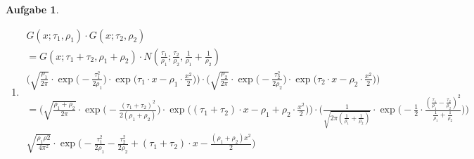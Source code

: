 \documentclass[12pt]{scrartcl}
\theoremstyle{definition}
\theoremstyle{exercise}
\newtheorem*{exercise*}{Aufgabe}
\begin{document}
\begin{exercise*}
\begin{enumerate}
			\item \scriptsize
				\begin{align*}
					G(x; \tau_{1}, \rho_{1}) \cdot G(x; \tau_{2}, \rho_{2})                                                                                                                                                                                                                                                                                                                                                                                                            &  \\
					= G(x; \tau_{1} + \tau_{2}, \rho_{1} + \rho_{2}) \cdot N(\frac{\tau_{1}}{\rho_{1}}; \frac{\tau_{2}}{\rho_{2}}, \frac{1}{\rho_{1}}+ \frac{1}{\rho_{2}})                                                                                                                                                                                                                                                                                                             &  \\
					\bigg(\sqrt{\frac{\rho_{1}}{2 \pi}}\cdot \exp\big(-\frac{\tau_{1}^{2}}{2\rho_{1}}\big) \cdot \exp\big(\tau_{1} \cdot x - \rho_{1} \cdot \frac{x^{2}}{2}\big)\bigg) \cdot \bigg(\sqrt{\frac{\rho_{2}}{2 \pi}}\cdot \exp\big(-\frac{\tau_{2}^{2}}{2\rho_{2}}\big) \cdot \exp\big(\tau_{2} \cdot x - \rho_{2} \cdot \frac{x^{2}}{2}\big)\bigg)                                                                                                                        &  \\
					= \bigg( \sqrt{\frac{\rho_{1} + \rho_{2}}{2 \pi}}\cdot \exp\big(-\frac{(\tau_{1} + \tau_{2})^{2}}{2(\rho_{1} + \rho_{2})}\big) \cdot \exp\big((\tau_{1} + \tau_{2}) \cdot x - \rho_{1} + \rho_{2} \cdot \frac{x^{2}}{2}\big) \bigg) \cdot \bigg( \frac{1}{\sqrt{2 \pi (\frac{1}{\rho_{1}} + \frac{1}{\rho_{2}})}}\cdot \exp\big(- \frac{1}{2} \cdot \frac{(\frac{\tau_1}{\rho_1}- \frac{\tau_2}{\rho_2})^{2}}{\frac{1}{\rho_{1}} + \frac{1}{\rho_{2}}}\big) \bigg) &  \\
					\sqrt{\frac{\rho_{1} \rho2}{4 \pi^{2}}}\cdot \exp\bigg(-\frac{\tau_{1}^{2}}{2\rho_{1}}-\frac{\tau_{2}^{2}}{2\rho_{2}}+ (\tau_{1} + \tau_{2}) \cdot x - \frac{(\rho_{1} + \rho_{2})x^{2}}{2}\bigg)                                                                                                                                                                                                                                                                  &  \\

\end{align*}
\end{enumerate}
\end{exercise*}
\end{document}
